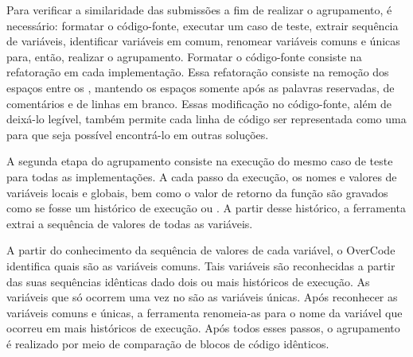 	    Para verificar a similaridade das submissões a fim de realizar o agrupamento,
	    é necessário: formatar o código-fonte, executar um caso de teste, extrair sequência
	    de variáveis, identificar variáveis em comum, renomear variáveis comuns e únicas
	    para, então, realizar o agrupamento. Formatar o código-fonte consiste na refatoração
	    em cada implementação. Essa refatoração consiste na remoção dos espaços entre os
	    , mantendo os espaços somente após as palavras reservadas, de
	    comentários e de linhas em branco. Essas modificação no código-fonte, além de
	    deixá-lo legível, também permite cada linha de código ser representada como
	    uma  para que seja possível encontrá-lo em outras soluções.
	    
	    A segunda etapa do agrupamento consiste na execução do mesmo caso de teste
	    para todas as implementações. A cada passo da execução, os nomes e valores de
	    variáveis locais e globais, bem como o valor de retorno da função são gravados
	    como se fosse um histórico de execução ou . A partir desse
	    histórico, a ferramenta extrai a sequência de valores de todas as variáveis.
	    
	    A partir do conhecimento da sequência de valores de cada variável, o OverCode
	    identifica quais são as variáveis comuns. Tais variáveis são reconhecidas a
	    partir das suas sequências idênticas dado dois ou mais históricos de execução.
	    As variáveis que só ocorrem uma vez no  são as variáveis únicas.
	    Após reconhecer as variáveis comuns e únicas, a ferramenta renomeia-as para o
	    nome da variável que ocorreu em mais históricos de execução. Após todos esses
	    passos, o agrupamento é realizado por meio de comparação de blocos de código
	    idênticos.
	    
%	    
	    

